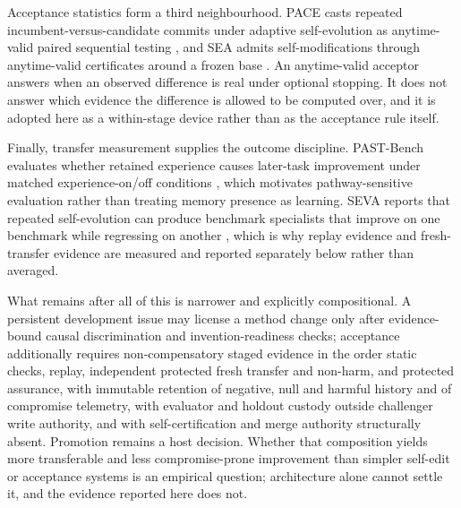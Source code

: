 Acceptance statistics form a third neighbourhood. PACE casts repeated incumbent-versus-candidate commits under adaptive self-evolution as anytime-valid paired sequential testing \cite{paceacceptance2026}, and SEA admits self-modifications through anytime-valid certificates around a frozen base \cite{sea2026}. An anytime-valid acceptor answers when an observed difference is real under optional stopping. It does not answer which evidence the difference is allowed to be computed over, and it is adopted here as a within-stage device rather than as the acceptance rule itself.

Finally, transfer measurement supplies the outcome discipline. PAST-Bench evaluates whether retained experience causes later-task improvement under matched experience-on/off conditions \cite{pastbench2026}, which motivates pathway-sensitive evaluation rather than treating memory presence as learning. SEVA reports that repeated self-evolution can produce benchmark specialists that improve on one benchmark while regressing on another \cite{seva2026}, which is why replay evidence and fresh-transfer evidence are measured and reported separately below rather than averaged.

What remains after all of this is narrower and explicitly compositional. A persistent development issue may license a method change only after evidence-bound causal discrimination and invention-readiness checks; acceptance additionally requires non-compensatory staged evidence in the order static checks, replay, independent protected fresh transfer and non-harm, and protected assurance, with immutable retention of negative, null and harmful history and of compromise telemetry, with evaluator and holdout custody outside challenger write authority, and with self-certification and merge authority structurally absent. Promotion remains a host decision. Whether that composition yields more transferable and less compromise-prone improvement than simpler self-edit or acceptance systems is an empirical question; architecture alone cannot settle it, and the evidence reported here does not.
